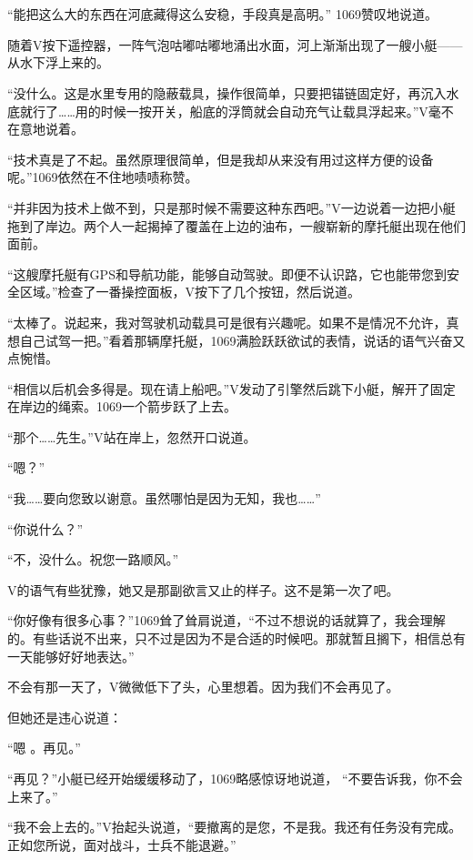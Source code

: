 \section*{}

“能把这么大的东西在河底藏得这么安稳，手段真是高明。” 1069赞叹地说道。

随着V按下遥控器，一阵气泡咕嘟咕嘟地涌出水面，河上渐渐出现了一艘小艇——从水下浮上来的。

“没什么。这是水里专用的隐蔽载具，操作很简单，只要把锚链固定好，再沉入水底就行了……用的时候一按开关，船底的浮筒就会自动充气让载具浮起来。”V毫不在意地说着。

“技术真是了不起。虽然原理很简单，但是我却从来没有用过这样方便的设备呢。”1069依然在不住地啧啧称赞。

“并非因为技术上做不到，只是那时候不需要这种东西吧。”V一边说着一边把小艇拖到了岸边。两个人一起揭掉了覆盖在上边的油布，一艘崭新的摩托艇出现在他们面前。

“这艘摩托艇有GPS和导航功能，能够自动驾驶。即便不认识路，它也能带您到安全区域。”检查了一番操控面板，V按下了几个按钮，然后说道。

“太棒了。说起来，我对驾驶机动载具可是很有兴趣呢。如果不是情况不允许，真想自己试驾一把。”看着那辆摩托艇，1069满脸跃跃欲试的表情，说话的语气兴奋又点惋惜。

“相信以后机会多得是。现在请上船吧。”V发动了引擎然后跳下小艇，解开了固定在岸边的绳索。1069一个箭步跃了上去。

“那个……先生。”V站在岸上，忽然开口说道。

“嗯？”

“我……要向您致以谢意。虽然哪怕是因为无知，我也……”

“你说什么？”

“不，没什么。祝您一路顺风。”

V的语气有些犹豫，她又是那副欲言又止的样子。这不是第一次了吧。

“你好像有很多心事？”1069耸了耸肩说道，“不过不想说的话就算了，我会理解的。有些话说不出来，只不过是因为不是合适的时候吧。那就暂且搁下，相信总有一天能够好好地表达。”

不会有那一天了，V微微低下了头，心里想着。因为我们不会再见了。

但她还是违心说道：

“嗯 。再见。”

“再见？”小艇已经开始缓缓移动了，1069略感惊讶地说道， “不要告诉我，你不会上来了。”

“我不会上去的。”V抬起头说道，“要撤离的是您，不是我。我还有任务没有完成。正如您所说，面对战斗，士兵不能退避。”

